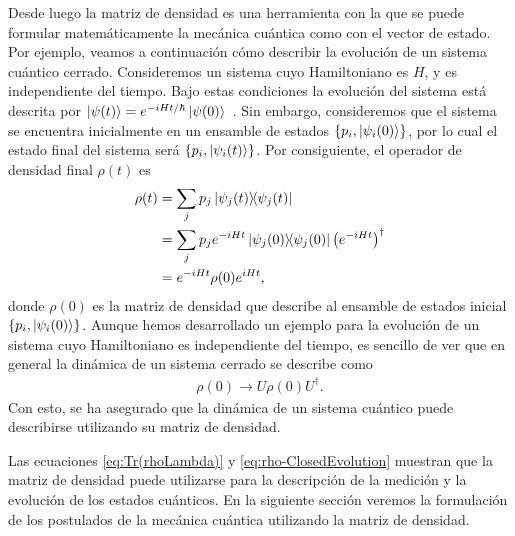 Desde luego la matriz de densidad es una herramienta con la que
se puede formular matemáticamente la mecánica cuántica como 
con el vector de estado. Por ejemplo, veamos a continuación cómo 
describir la evolución de un sistema cuántico cerrado.
Consideremos un sistema cuyo Hamiltoniano es $H$, y es
independiente del tiempo. Bajo estas condiciones la evolución
del sistema está descrita por 
$\ket{\psi (t)}=e^{-iHt/\hbar}\ket{\psi(0)}$~\cite{sakurai2010modern}. 
Sin embargo, consideremos que el sistema se encuentra inicialmente
en un ensamble de estados $\{p_i, \ket{\psi_i(0)}\}$, por lo cual
el estado final del sistema será 
$\{p_i, \ket{\psi_i(t)}\}$.
Por consiguiente, el operador de densidad final $\rho(t)$  es 
\begin{align} \label{eq:Rho-evolution-H}
	\rho(t) &= \sum_j p_j\dyad{\psi_j(t)}{\psi_j(t)}\nonumber\\
	&= \sum_j p_j e^{-iHt} \dyad{\psi_j(0)}{\psi_j(0)}\qty(e^{-iHt})^{\dagger}
	\nonumber\\
	&= e^{-iHt}\rho(0)e^{iHt},
\end{align}
donde $\rho(0)$ es la matriz de densidad que describe al ensamble 
de estados inicial $\{p_i, \ket{\psi_i(0)}\}$.	 Aunque hemos desarrollado 
un ejemplo para la evolución de un sistema cuyo Hamiltoniano es 
independiente del tiempo, es sencillo de ver que en general la dinámica  
de un sistema cerrado se describe como 
\begin{align}\label{eq:rho-ClosedEvolution}
\rho(0) \longrightarrow U\rho(0)U^{\dagger}.
\end{align}
Con esto, se ha asegurado que la dinámica de un sistema cuántico puede 
describirse utilizando su matriz de densidad. 

Las ecuaciones \eqref{eq:Tr(rhoLambda)} y \eqref{eq:rho-ClosedEvolution}
muestran que la matriz de densidad puede utilizarse para la descripción 
de la medición y la evolución de los estados cuánticos. 
En la siguiente sección veremos la formulación de los postulados 
de la mecánica cuántica utilizando la matriz de densidad. 

